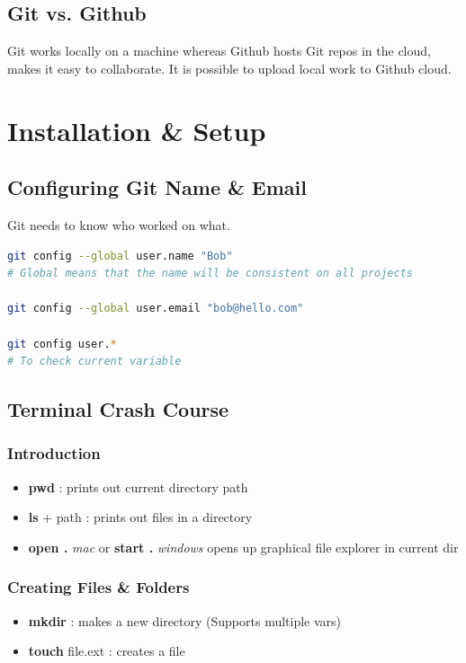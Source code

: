 \documentclass{report}
\begin{document}
\section{Git vs. Github}
Git works locally on a machine whereas Github hosts Git repos in the cloud, makes it easy to collaborate. It is possible to upload local work to Github cloud.



\chapter{Installation \& Setup}


\section{Configuring Git Name \& Email}

Git needs to know who worked on what.

\begin{tcolorbox}[title=,colback=backcolour]
\begin{lstlisting}[language=bash]
git config --global user.name "Bob"
# Global means that the name will be consistent on all projects

git config --global user.email "bob@hello.com"

git config user.*
# To check current variable
\end{lstlisting}
\end{tcolorbox}


\section{Terminal Crash Course}

\subsection{Introduction}
\begin{itemize}
	\item \textbf{pwd} : prints out current directory path 
	\item \textbf{ls} + path : prints out files in a directory
	\item \textbf{open .} \textit{mac} or \textbf{start .} \textit{windows} opens up graphical file explorer in current dir 
\end{itemize}

\subsection{Creating Files \& Folders}
\begin{itemize}
	\item \textbf{mkdir} : makes a new directory (Supports multiple vars)
	\item \textbf{touch} file.ext : creates a file
\end{itemize}
\end{document}
